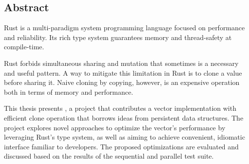 \vspace*{2cm}
\thispagestyle{plain}

{}

\begin{center}
\section*{Abstract}
\end{center}

Rust is a multi-paradigm system programming language focused on performance and reliability. Its rich type system guarantees memory and thread-safety at compile-time.

Rust forbids simultaneous sharing and mutation that sometimes is a necessary and useful pattern. A way to mitigate this limitation in Rust is to clone a value before sharing it. Naive cloning by copying, however, is an expensive operation both in terms of memory and performance.

This thesis presents \pvecrs{}, a project that contributes a vector implementation with efficient clone operation that borrows ideas from persistent data structures. The project explores novel approaches to optimize the vector's performance by leveraging Rust's type system, as well as aiming to achieve convenient, idiomatic interface familiar to developers. The proposed optimizations are evaluated and discussed based on the results of the sequential and parallel test suite.
